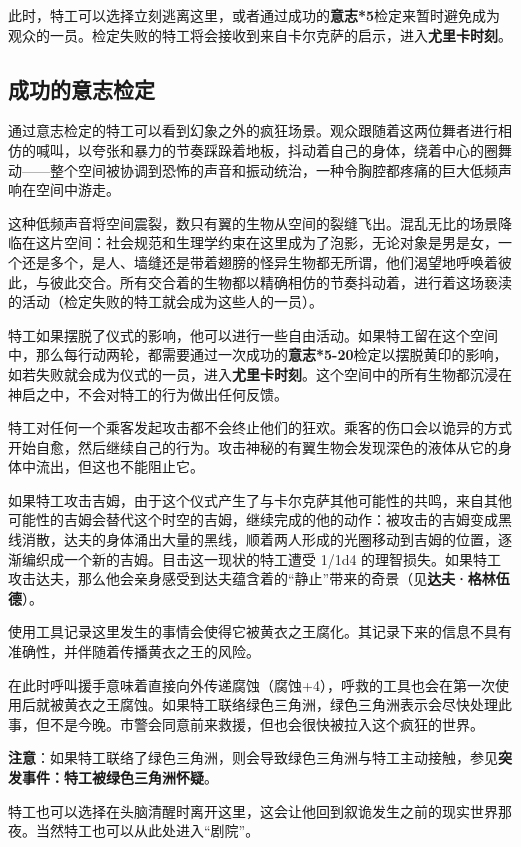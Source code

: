 此时，特工可以选择立刻逃离这里，或者通过成功的\textbf{意志*5}检定来暂时避免成为观众的一员。检定失败的特工将会接收到来自卡尔克萨的启示，进入\textbf{尤里卡时刻}。

\subsection{成功的意志检定}
通过意志检定的特工可以看到幻象之外的疯狂场景。观众跟随着这两位舞者进行相仿的喊叫，以夸张和暴力的节奏踩跺着地板，抖动着自己的身体，绕着中心的圈舞动——整个空间被协调到恐怖的声音和振动统治，一种令胸腔都疼痛的巨大低频声响在空间中游走。

这种低频声音将空间震裂，数只有翼的生物从空间的裂缝飞出。混乱无比的场景降临在这片空间：社会规范和生理学约束在这里成为了泡影，无论对象是男是女，一个还是多个，是人、墙缝还是带着翅膀的怪异生物都无所谓，他们渴望地呼唤着彼此，与彼此交合。所有交合着的生物都以精确相仿的节奏抖动着，进行着这场亵渎的活动（检定失败的特工就会成为这些人的一员）。

特工如果摆脱了仪式的影响，他可以进行一些自由活动。如果特工留在这个空间中，那么每行动两轮，都需要通过一次成功的\textbf{意志*5-20}检定以摆脱黄印的影响，如若失败就会成为仪式的一员，进入\textbf{尤里卡时刻}。这个空间中的所有生物都沉浸在神启之中，不会对特工的行为做出任何反馈。

特工对任何一个乘客发起攻击都不会终止他们的狂欢。乘客的伤口会以诡异的方式开始自愈，然后继续自己的行为。攻击神秘的有翼生物会发现深色的液体从它的身体中流出，但这也不能阻止它。

如果特工攻击吉姆，由于这个仪式产生了与卡尔克萨其他可能性的共鸣，来自其他可能性的吉姆会替代这个时空的吉姆，继续完成的他的动作：被攻击的吉姆变成黑线消散，达夫的身体涌出大量的黑线，顺着两人形成的光圈移动到吉姆的位置，逐渐编织成一个新的吉姆。目击这一现状的特工遭受 1/1d4 的理智损失。如果特工攻击达夫，那么他会亲身感受到达夫蕴含着的“静止”带来的奇景（见\textbf{达夫·格林伍德}）。

使用工具记录这里发生的事情会使得它被黄衣之王腐化。其记录下来的信息不具有准确性，并伴随着传播黄衣之王的风险。

在此时呼叫援手意味着直接向外传递腐蚀（腐蚀+4），呼救的工具也会在第一次使用后就被黄衣之王腐蚀。如果特工联络绿色三角洲，绿色三角洲表示会尽快处理此事，但不是今晚。市警会同意前来救援，但也会很快被拉入这个疯狂的世界。

\textbf{注意}：如果特工联络了绿色三角洲，则会导致绿色三角洲与特工主动接触，参见\textbf{突发事件：特工被绿色三角洲怀疑}。

特工也可以选择在头脑清醒时离开这里，这会让他回到叙诡发生之前的现实世界那夜。当然特工也可以从此处进入“剧院”。


